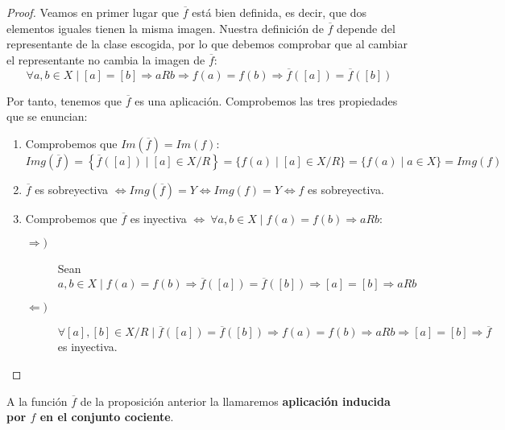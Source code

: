 \begin{proof}
    Veamos en primer lugar que $\overline{f}$ está bien definida, es decir, que dos elementos iguales tienen la misma imagen. Nuestra definición de $\overline{f}$ depende del representante de la clase escogida, por lo que debemos comprobar que al cambiar el representante no cambia la imagen de $\overline{f}$:
    $$\forall a, b \in X \mid [a] = [b] \Rightarrow aRb \Rightarrow f(a) = f(b) \Rightarrow \overline{f}\left([a]\right) = \overline{f}\left([b]\right)$$

    Por tanto, tenemos que $\overline{f}$ es una aplicación. Comprobemos las tres propiedades que se enuncian:
    \begin{enumerate}
        \item Comprobemos que $Im\left(\overline{f}\right)=Im(f)$:
        $$Img\left(\overline{f}\right) = \left\{\overline{f}\left([a]\right) \mid [a] \in X/R\right\} = \{f(a) \mid [a] \in X/R\} = \{f(a) \mid a \in X\} = Img(f)$$

        \item $\overline{f}$ es sobreyectiva $\Longleftrightarrow Img\left(\overline{f}\right) = Y \Longleftrightarrow Img(f) = Y \Longleftrightarrow f$ es sobreyectiva.

        \item Comprobemos que $\overline{f}$ es inyectiva $\Longleftrightarrow~\forall a,b \in X \mid f(a) = f(b) \Rightarrow aRb$:
        \begin{description}
            \item[$\Longrightarrow)$] Sean $a,b \in X \mid f(a) = f(b) \Rightarrow \overline{f}\left([a]\right) = \overline{f}\left([b]\right) \Rightarrow [a] = [b] \Rightarrow aRb$

            \item[$\Longleftarrow)$] $\forall [a], [b] \in X/R \mid \overline{f}\left([a]\right) = \overline{f}\left([b]\right) \Rightarrow f(a) = f(b) \Rightarrow aRb \Rightarrow [a] = [b] \Rightarrow \overline{f}$ es inyectiva.
        \end{description}
    \end{enumerate}
\end{proof}

A la función $\overline{f}$ de la proposición anterior la llamaremos \textbf{aplicación inducida por $f$ en el conjunto cociente}.
